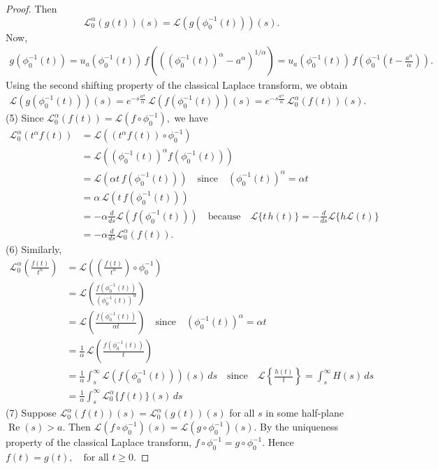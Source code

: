 \documentclass[two side,reqno,12pt]{amsart}
\numberwithin{equation}{section}
\theoremstyle{definition}
\begin{document}
\begin{proof}
Then
\[
\mathcal{L}_0^\alpha(g(t))(s)
= \mathcal{L}(g(\phi_0^{-1}(t)))(s).
\]
Now,
\begin{align*}
g(\phi_0^{-1}(t))
= u_a(\phi_0^{-1}(t)) \, f\!\left( \left( (\phi_0^{-1}(t))^\alpha - a^\alpha \right)^{1/\alpha} \right)
= u_a(\phi_0^{-1}(t)) \, f\!\left( \phi_0^{-1}\!\left( t - \frac{a^\alpha}{\alpha} \right) \right).
\end{align*}
Using the second shifting property of the classical Laplace transform, we obtain
\begin{align*}
    \mathcal{L}(g(\phi_0^{-1}(t)))(s)
= e^{-s\frac{a^\alpha}{\alpha}} \, \mathcal{L}(f(\phi_0^{-1}(t)))(s)
= e^{-s\frac{a^\alpha}{\alpha}} \, \mathcal{L}_0^\alpha(f(t))(s).
\end{align*}
(5) Since \( \mathcal{L}_0^\alpha(f(t)) = \mathcal{L}(f \circ \phi_0^{-1}),\)
we have
\begin{align*}
   \mathcal{L}_0^\alpha(t^\alpha f(t))
     &= \mathcal{L}((t^\alpha f(t)) \circ \phi_0^{-1})\\
     &= \mathcal{L}((\phi_0^{-1}(t))^\alpha f(\phi_0^{-1}(t)))\\
     & = \mathcal{L}(\alpha t \, f(\phi_0^{-1}(t))) \quad \text{since}\quad(\phi_0^{-1}(t))^\alpha = \alpha t \\
    &= \alpha \, \mathcal{L}(t \, f(\phi_0^{-1}(t)))\\
    &= -\alpha \frac{d}{ds} \mathcal{L}(f(\phi_0^{-1}(t)))\quad    \text{because}\quad\mathcal{L}\{t \, h(t)\} = -\frac{d}{ds} \mathcal{L}\{h\mathcal{L}(t)\}      \\
    &= -\alpha \frac{d}{ds} \mathcal{L}_0^\alpha(f(t)).
\end{align*}
(6) Similarly, 
\begin{align*}
  \mathcal{L}_0^\alpha\left( \frac{f(t)}{t^\alpha} \right)
&= \mathcal{L}\left( \left( \frac{f(t)}{t^\alpha} \right) \circ \phi_0^{-1} \right)\\
&= \mathcal{L}\left( \frac{f(\phi_0^{-1}(t))}{(\phi_0^{-1}(t))^\alpha} \right)\\ 
&= \mathcal{L}\left( \frac{f(\phi_0^{-1}(t))}{\alpha t} \right)     \quad \text{since}\quad(\phi_0^{-1}(t))^\alpha = \alpha t \\
&= \frac{1}{\alpha} \, \mathcal{L}\left( \frac{f(\phi_0^{-1}(t))}{t} \right)\\
&= \frac{1}{\alpha} \int_s^\infty \mathcal{L}(f(\phi_0^{-1}(t)))(s) \, ds \quad\text{since}\quad\mathcal{L}\left\{\frac{h(t)}{t}\right\} = \int_s^\infty H(s) \, ds\\
&=\frac{1}{\alpha} \int_s^\infty  \mathcal{L}_0^\alpha \{ f(t) \}(s) \, ds 
\end{align*}
(7) Suppose
\(
\mathcal{L}_0^\alpha(f(t))(s) = \mathcal{L}_0^\alpha(g(t))(s)
\)
for all \( s \) in some half-plane \( \operatorname{Re}(s) > a\).
Then
\(
\mathcal{L}(f \circ \phi_0^{-1})(s) = \mathcal{L}(g \circ \phi_0^{-1})(s).
\)
By the uniqueness property of the classical Laplace transform,
\(
f \circ \phi_0^{-1} = g \circ \phi_0^{-1}.
\)
Hence
\(
f(t) = g(t), \quad \text{for all } t \geq 0.
\)
\end{proof}
\end{document}
